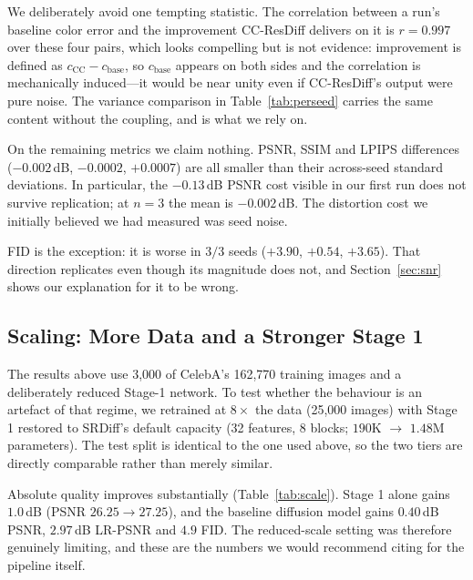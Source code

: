 \documentclass[11pt]{article}
\begin{document}
We deliberately avoid one tempting statistic. The correlation between a run's
baseline color error and the improvement CC-ResDiff delivers on it is $r=0.997$
over these four pairs, which looks compelling but is not evidence: improvement is
defined as $c_{\text{CC}} - c_{\text{base}}$, so $c_{\text{base}}$ appears on both
sides and the correlation is mechanically induced---it would be near unity even
if CC-ResDiff's output were pure noise. The variance comparison in
Table~\ref{tab:perseed} carries the same content without the coupling, and is
what we rely on.

On the remaining metrics we claim nothing. PSNR, SSIM and LPIPS differences
($-0.002$\,dB, $-0.0002$, $+0.0007$) are all smaller than their across-seed
standard deviations. In particular, the $-0.13$\,dB PSNR cost visible in our
first run does not survive replication; at $n=3$ the mean is $-0.002$\,dB. The
distortion cost we initially believed we had measured was seed noise.

FID is the exception: it is worse in $3/3$ seeds ($+3.90$, $+0.54$, $+3.65$).
That direction replicates even though its magnitude does not, and
Section~\ref{sec:snr} shows our explanation for it to be wrong.

\subsection{Scaling: More Data and a Stronger Stage 1}
\label{sec:scale}

The results above use 3{,}000 of CelebA's 162{,}770 training images and a
deliberately reduced Stage-1 network. To test whether the behaviour is an
artefact of that regime, we retrained at $8\times$ the data (25{,}000 images)
with Stage 1 restored to SRDiff's default capacity (32 features, 8 blocks;
$190$K $\rightarrow$ $1.48$M parameters). The test split is identical to the one
used above, so the two tiers are directly comparable rather than merely similar.

Absolute quality improves substantially (Table~\ref{tab:scale}). Stage 1 alone
gains $1.0$\,dB (PSNR $26.25 \rightarrow 27.25$), and the baseline diffusion
model gains $0.40$\,dB PSNR, $2.97$\,dB LR-PSNR and $4.9$ FID. The reduced-scale
setting was therefore genuinely limiting, and these are the numbers we would
recommend citing for the pipeline itself.
\end{document}
